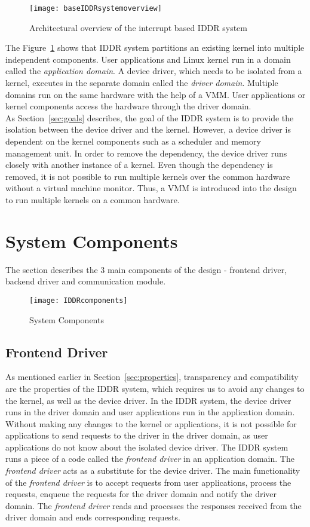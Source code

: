 \begin{figure}[!ht]
\centering
\texttt{[image: baseIDDRsystemoverview]}
\caption{Architectural overview of the interrupt based IDDR system}
\label{fig:base IDDR system overview}
\end{figure}
The Figure~\ref{fig:base IDDR system overview} shows that IDDR system partitions an existing kernel into multiple independent components. User applications and Linux kernel run in a domain called the \textit{application domain}. A device driver, which needs to be isolated from a kernel, executes in the separate domain called the \textit{driver domain}. Multiple domains run on the same hardware with the help of a VMM. User applications or kernel components access the hardware through the driver domain.
\\[3mm]
As Section~\ref{sec:goals} describes, the goal of the IDDR system is to provide the isolation between the device driver and the kernel. However, a device driver is dependent on the kernel components such as a scheduler and memory management unit. In order to remove the dependency, the device driver runs closely with another instance of a kernel. Even though the dependency is removed, it is not possible to run multiple kernels over the common hardware without a virtual machine monitor. Thus, a VMM is introduced into the design to run multiple kernels on a common hardware. 

\section{System Components}\label{components}
The section describes the 3 main components of the design - frontend driver, backend driver and communication module.
\begin{figure}[!ht]
\centering
\texttt{[image: IDDRcomponents]}
\caption{System Components}
\label{fig:Design Evo1}
\end{figure}

\subsection{Frontend Driver}
\label{subsec:frontend}
As mentioned earlier in Section~\ref{sec:properties}, transparency and compatibility are the properties of the IDDR system, which requires us to avoid any changes to the kernel, as well as the device driver. In the IDDR system, the device driver runs in the driver domain and user applications run in the application domain. Without making any changes to the kernel or applications, it is not possible for applications to send requests to the driver in the driver domain, as user applications do not know about the isolated device driver. The IDDR system runs a piece of a code called the \textit{frontend driver} in an application domain. The \textit{frontend driver} acts as a substitute for the device driver. The main functionality of the \textit{frontend driver} is to accept requests from user applications, process the requests, enqueue the requests for the driver domain and notify the driver domain. The \textit{frontend driver} reads and processes the responses received from the driver domain and ends corresponding requests.

